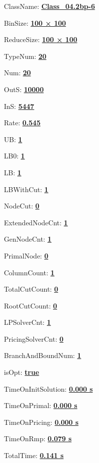 \documentclass[11pt]{article}
\begin{document}
\pagestyle{empty}


ClassName: \underline{\textbf{Class_04.2bp-6}}
\par
BinSize: \underline{\textbf{100 × 100}}
\par
ReduceSize: \underline{\textbf{100 × 100}}
\par
TypeNum: \underline{\textbf{20}}
\par
Num: \underline{\textbf{20}}
\par
OutS: \underline{\textbf{10000}}
\par
InS: \underline{\textbf{5447}}
\par
Rate: \underline{\textbf{0.545}}
\par
UB: \underline{\textbf{1}}
\par
LB0: \underline{\textbf{1}}
\par
LB: \underline{\textbf{1}}
\par
LBWithCut: \underline{\textbf{1}}
\par
NodeCut: \underline{\textbf{0}}
\par
ExtendedNodeCnt: \underline{\textbf{1}}
\par
GenNodeCnt: \underline{\textbf{1}}
\par
PrimalNode: \underline{\textbf{0}}
\par
ColumnCount: \underline{\textbf{1}}
\par
TotalCutCount: \underline{\textbf{0}}
\par
RootCutCount: \underline{\textbf{0}}
\par
LPSolverCnt: \underline{\textbf{1}}
\par
PricingSolverCnt: \underline{\textbf{0}}
\par
BranchAndBoundNum: \underline{\textbf{1}}
\par
isOpt: \underline{\textbf{true}}
\par
TimeOnInitSolution: \underline{\textbf{0.000 s}}
\par
TimeOnPrimal: \underline{\textbf{0.000 s}}
\par
TimeOnPricing: \underline{\textbf{0.000 s}}
\par
TimeOnRmp: \underline{\textbf{0.079 s}}
\par
TotalTime: \underline{\textbf{0.141 s}}
\par
\newpage
\end{document}
